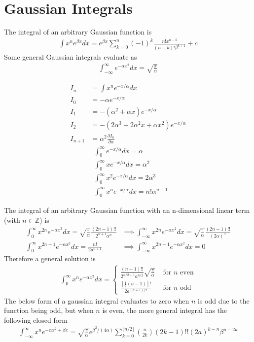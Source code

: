 \section{Gaussian Integrals}
The integral of an arbitrary Gaussian function is
\begin{align}
\int x^ne^{\beta x} dx = e^{\beta x}\sum_{k=0}^{n}(-1)^k\frac{n!x^{n-k}}{(n-k)!\beta^{k+1}}+c
\end{align}
Some general Gaussian integrals evaluate as
\begin{align}
\int_{-\infty}^{\infty} e^{-\alpha x^2} dx = \sqrt{\frac{\pi}{\alpha}} 
\end{align}
\begin{multicols}{2}
	\noindent
\begin{align}
I_n&=\int x^ne^{-x/\alpha}dx \\
I_0&= -\alpha e^{-x/\alpha} \\
I_1&= -(\alpha^2+\alpha x) e^{-x/\alpha} \\
I_2&= -(2\alpha^3+2\alpha^2 x+\alpha x^2) e^{-x/\alpha} \\
I_{n+1}&=\alpha^2\frac{\partial  I_n}{\partial \alpha} 
\end{align}
\begin{align}
&\int_{0}^{\infty}e^{-x/\alpha}dx = \alpha \\
&\int_{0}^{\infty}xe^{-x/\alpha}dx = \alpha^2 \\
&\int_{0}^{\infty}x^2e^{-x/\alpha}dx = 2\alpha^3 \\
&\int_{0}^{\infty}x^ne^{-x/\alpha}dx = n!\alpha^{n+1}
\end{align}
\end{multicols}
The integral of an arbitrary Gaussian function with an n-dimensional linear term (with $n \in \mathbb{Z}$) is
\begin{align}
\int_{0}^{\infty}x^{2n}e^{-\alpha x^2}dx = \sqrt{\frac{\pi}{\alpha}}\frac{(2n-1)!!}{2^{n+1}\alpha^n} &\implies  \int_{-\infty}^{\infty}x^{2n}e^{-\alpha x^2}dx = \sqrt{\frac{\pi}{\alpha}}\frac{(2n-1)!!}{(2\alpha)^n}\\
\int_{0}^{\infty}x^{2n+1}e^{-\alpha x^2}dx = \frac{n!}{2a^{n+1}} &\implies \int_{-\infty}^{\infty}x^{2n+1}e^{-\alpha x^2}dx = 0
\end{align}
Therefore a general solution is
\begin{align}
\int_{0}^{\infty}x^ne^{-\alpha x^2}dx = 
\begin{cases}
\displaystyle
\frac{(n-1)!!}{2^{n/2+1}a^{n/2}}\sqrt{\frac{\pi}{\alpha}} & \textrm{ for $n$ even} \\
\displaystyle
\frac{[\frac{1}{2}(n-1)]!}{2a^{(n+1)/2}}& \textrm{ for $n$ odd} 
\end{cases}
\end{align}
The below form of a gaussian integral evaluates to zero when $n$ is odd due to the function being odd, but when $n$ is even, the more general integral has the following closed form
\begin{align}
\int_{-\infty}^{\infty} x^ne^{-\alpha x^2+\beta x}=\sqrt{\frac{\pi}{\alpha}}e^{\beta^2/(4\alpha)}\sum_{k=0}^{\lfloor n/2\rfloor} {{n}\choose{2k}} (2k-1)!!(2a)^{k-n}\beta^{n-2k}
\end{align}
